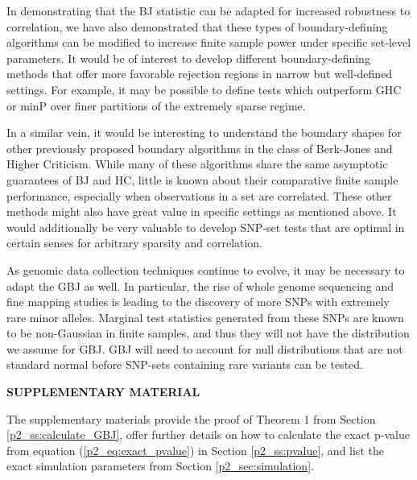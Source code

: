 \documentclass[12pt]{article}
\begin{document}
In demonstrating that the BJ statistic can be adapted for increased robustness to correlation, 
we have also demonstrated that these types of boundary-defining algorithms can be modified 
to increase finite sample power under specific set-level parameters.
It would be of interest to develop different boundary-defining methods that offer more favorable 
rejection regions in narrow but well-defined settings.
For example, it may be possible to define tests which outperform GHC or minP over
finer partitions of the extremely sparse regime.

In a similar vein, it would be interesting to understand the boundary shapes for other previously 
proposed boundary algorithms \citep{Phi_divergences} in the class of Berk-Jones and Higher Criticism.
While many of these algorithms share the same asymptotic guarantees of BJ and HC, 
little is known about their comparative finite sample performance, especially when observations in a set are correlated.
These other methods might also have great value in specific settings as mentioned above.
It would additionally be very valuable to develop SNP-set tests that are optimal in certain senses
for arbitrary sparsity and correlation.

As genomic data collection techniques continue to evolve, it may be necessary to adapt the GBJ as well.  
In particular, the rise of whole genome sequencing and fine mapping studies is leading to the discovery of more SNPs
with extremely rare minor alleles.
Marginal test statistics generated from these SNPs are known to be non-Gaussian in finite samples, and thus
they will not have the distribution we assume for GBJ.  
GBJ will need to account for null distributions that are not standard normal before SNP-sets 
containing rare variants can be tested.



\bigskip
\begin{center}
{\large\bf SUPPLEMENTARY MATERIAL}
\end{center}

The supplementary materials provide the proof of Theorem 1 from Section \ref{p2_ss:calculate_GBJ},  
offer further details on how to calculate the exact p-value from equation (\ref{p2_eq:exact_pvalue}) in Section \ref{p2_ss:pvalue},
and list the exact simulation parameters from Section \ref{p2_sec:simulation}.





\end{document}
